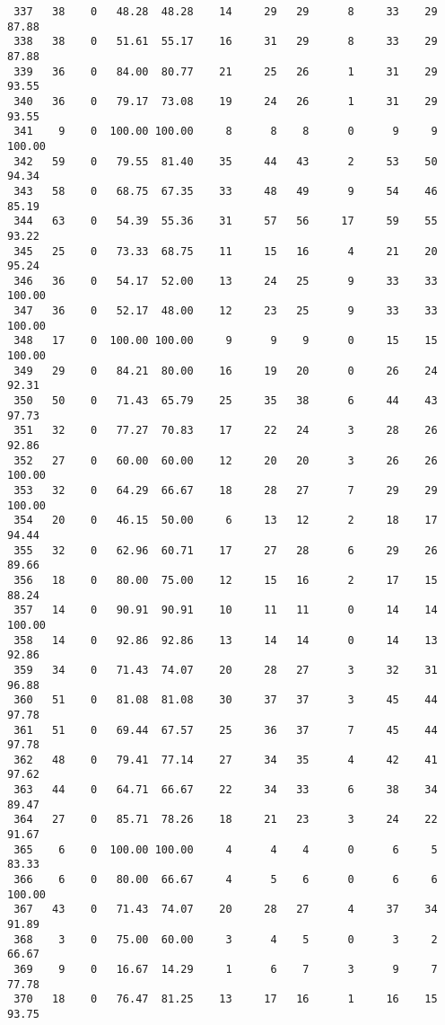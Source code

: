 \begin{verbatim}
 337   38    0   48.28  48.28    14     29   29      8     33    29    87.88
 338   38    0   51.61  55.17    16     31   29      8     33    29    87.88
 339   36    0   84.00  80.77    21     25   26      1     31    29    93.55
 340   36    0   79.17  73.08    19     24   26      1     31    29    93.55
 341    9    0  100.00 100.00     8      8    8      0      9     9   100.00
 342   59    0   79.55  81.40    35     44   43      2     53    50    94.34
 343   58    0   68.75  67.35    33     48   49      9     54    46    85.19
 344   63    0   54.39  55.36    31     57   56     17     59    55    93.22
 345   25    0   73.33  68.75    11     15   16      4     21    20    95.24
 346   36    0   54.17  52.00    13     24   25      9     33    33   100.00
 347   36    0   52.17  48.00    12     23   25      9     33    33   100.00
 348   17    0  100.00 100.00     9      9    9      0     15    15   100.00
 349   29    0   84.21  80.00    16     19   20      0     26    24    92.31
 350   50    0   71.43  65.79    25     35   38      6     44    43    97.73
 351   32    0   77.27  70.83    17     22   24      3     28    26    92.86
 352   27    0   60.00  60.00    12     20   20      3     26    26   100.00
 353   32    0   64.29  66.67    18     28   27      7     29    29   100.00
 354   20    0   46.15  50.00     6     13   12      2     18    17    94.44
 355   32    0   62.96  60.71    17     27   28      6     29    26    89.66
 356   18    0   80.00  75.00    12     15   16      2     17    15    88.24
 357   14    0   90.91  90.91    10     11   11      0     14    14   100.00
 358   14    0   92.86  92.86    13     14   14      0     14    13    92.86
 359   34    0   71.43  74.07    20     28   27      3     32    31    96.88
 360   51    0   81.08  81.08    30     37   37      3     45    44    97.78
 361   51    0   69.44  67.57    25     36   37      7     45    44    97.78
 362   48    0   79.41  77.14    27     34   35      4     42    41    97.62
 363   44    0   64.71  66.67    22     34   33      6     38    34    89.47
 364   27    0   85.71  78.26    18     21   23      3     24    22    91.67
 365    6    0  100.00 100.00     4      4    4      0      6     5    83.33
 366    6    0   80.00  66.67     4      5    6      0      6     6   100.00
 367   43    0   71.43  74.07    20     28   27      4     37    34    91.89
 368    3    0   75.00  60.00     3      4    5      0      3     2    66.67
 369    9    0   16.67  14.29     1      6    7      3      9     7    77.78
 370   18    0   76.47  81.25    13     17   16      1     16    15    93.75

\end{verbatim}
